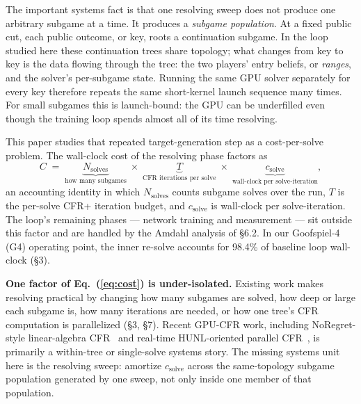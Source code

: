 \documentclass[11pt]{article}
\begin{document}
The important systems fact is that one resolving sweep does not produce one arbitrary
subgame at a time. It produces a \emph{subgame population}. At a fixed public cut, each
public outcome, or key, roots a continuation subgame. In the loop studied here these
continuation trees share topology; what changes from key to key is the data flowing
through the tree: the two players' entry beliefs, or \emph{ranges}, and the solver's
per-subgame state. Running the same GPU solver separately for every key therefore
repeats the same short-kernel launch sequence many times. For small subgames this is
launch-bound: the GPU can be underfilled even though the training loop spends almost all
of its time resolving.

This paper studies that repeated target-generation step as a cost-per-solve problem. The
wall-clock cost of the resolving phase factors as
\begin{equation}
C \;=\; \underbrace{N_{\text{solves}}}_{\text{how many subgames}} \;\times\;
\underbrace{T}_{\text{CFR iterations per solve}} \;\times\;
\underbrace{c_{\text{solve}}}_{\text{wall-clock per solve-iteration}} ,
\label{eq:cost}
\end{equation}
an accounting identity in which $N_{\text{solves}}$ counts subgame solves over the run,
$T$ is the per-solve CFR+ iteration budget, and $c_{\text{solve}}$ is wall-clock per
solve-iteration. The loop's remaining phases --- network training and measurement ---
sit outside this factor and are handled by the Amdahl analysis of \S6.2. In our
Goofspiel-4 (G4) operating point, the inner re-solve accounts for 98.4\% of baseline
loop wall-clock (\S3).

\textbf{One factor of Eq.~(\ref{eq:cost}) is under-isolated.} Existing work makes
resolving practical by changing how many subgames are solved, how deep or large each
subgame is, how many iterations are needed, or how one tree's CFR computation is
parallelized (\S3, \S7). Recent GPU-CFR work, including NoRegret-style linear-algebra
CFR~\citep{Kim2024,KimSandholm2026} and real-time HUNL-oriented parallel
CFR~\citep{RealTimeParallelCFR}, is primarily a within-tree or single-solve systems
story. The missing systems unit here is the resolving sweep: amortize
$c_{\text{solve}}$ across the same-topology subgame population generated by one sweep,
not only inside one member of that population.
\end{document}
